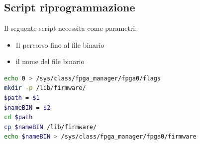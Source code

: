 \chapter{}
\section{Script riprogrammazione}
\label{Riprogrammazione}
Il seguente script necessita come parametri:
\begin{itemize}
    \item Il percorso fino al file binario
    \item il nome del file binario
\end{itemize}
\begin{lstlisting}[language=sh, label=lst:sh, caption={Codice completo riprogrammazione automatica FPGA}]
echo 0 > /sys/class/fpga_manager/fpga0/flags
mkdir -p /lib/firmware/
$path = $1
$nameBIN = $2
cd $path
cp $nameBIN /lib/firmware/
echo $nameBIN > /sys/class/fpga_manager/fpga0/firmware
\end{lstlisting}



